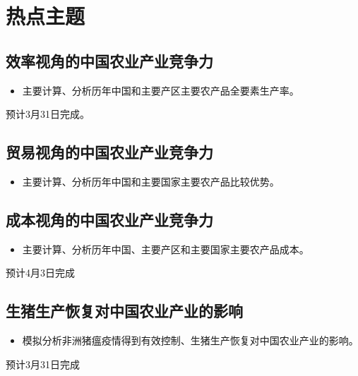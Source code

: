 \documentclass{progbookcn}
\begin{document}
\part{热点主题}

\chapter{效率视角的中国农业产业竞争力}
\begin{titledbox}{}
\begin{itemize}
  \item 主要计算、分析历年中国和主要产区主要农产品全要素生产率。
 \end{itemize}
\end{titledbox}
预计3月31日完成。

\chapter{贸易视角的中国农业产业竞争力}
\begin{titledbox}{}
\begin{itemize}
  \item 主要计算、分析历年中国和主要国家主要农产品比较优势。
 \end{itemize}
\end{titledbox}


\chapter{成本视角的中国农业产业竞争力}
\begin{titledbox}{}
\begin{itemize}
  \item 主要计算、分析历年中国、主要产区和主要国家主要农产品成本。
 \end{itemize}
\end{titledbox}
预计4月3日完成

\chapter{生猪生产恢复对中国农业产业的影响}
\begin{titledbox}{}
\begin{itemize}
  \item 模拟分析非洲猪瘟疫情得到有效控制、生猪生产恢复对中国农业产业的影响。
 \end{itemize}
\end{titledbox}
预计3月31日完成
\end{document}
